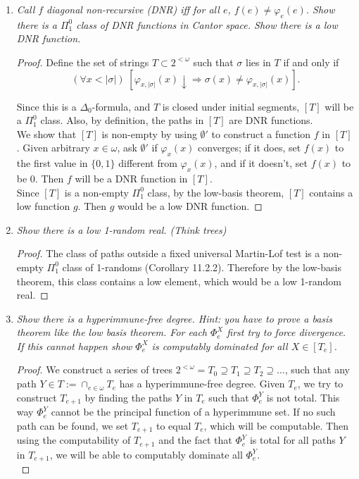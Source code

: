 \documentclass{article}
\begin{document}
\begin{enumerate}
  \item \it Call $f$ diagonal non-recursive (DNR) iff for all $e$,
    $f(e)\neq\varphi_e(e)$. Show there is a $\Pi_1^0$ class of DNR
    functions in Cantor space. Show there is a low DNR function.

    \begin{proof}
      Define the set of strings $T\subset2^{<\omega}$ such that $\sigma$
      lies in $T$ if and only if
      \[(\forall x<|\sigma|)\; [\varphi_{x,|\sigma|}(x)\downarrow
      \Rightarrow \sigma(x) \neq\varphi_{x,|\sigma|}(x)].\]

      Since this is a $\Delta_0$-formula, and $T$ is closed under initial
      segments, $[T]$ will be a $\Pi_1^0$ class. Also, by definition, the
      paths in $[T]$ are DNR functions. \\

      We show that $[T]$ is non-empty by using $\emptyset'$ to construct a
      function $f$ in $[T]$. Given arbitrary $x\in\omega$, ask $\emptyset'$
      if $\varphi_x(x)$ converges; if it does, set $f(x)$ to the first
      value in $\{0,1\}$ different from $\varphi_x(x)$, and if it
      doesn't, set $f(x)$ to be 0. Then $f$ will be a DNR function in
      $[T]$. \\

      Since $[T]$ is a non-empty $\Pi_1^0$ class, by the low-basis theorem,
      $[T]$ contains a low function $g$. Then $g$ would be a low DNR
      function.
    \end{proof}

  \item \it Show there is a low 1-random real. (Think trees)
    \begin{proof}
      The class of paths outside a fixed universal Martin-Lof test is a
      non-empty $\Pi_1^0$ class of 1-randoms (Corollary 11.2.2). Therefore
      by the low-basis theorem, this class contains a low element, which
      would be a low 1-random real.
    \end{proof}

  \item \it Show there is a hyperimmune-free degree. Hint: you have to
    prove a basis theorem like the low basis theorem. For each $\Phi^X_e$
    first try to force divergence. If this cannot happen show $\Phi_e^X$ is
    computably dominated for all $X\in[T_e]$.

    \begin{proof}
      We construct a series of trees $2^{<\omega}=T_0\supseteq T_1\supseteq
      T_2\supseteq\ldots$, such that any path $Y\in
      T:=\cap_{e\in\omega}T_e$ has a hyperimmune-free degree. Given $T_e$,
      we try to construct $T_{e+1}$ by finding the paths $Y$ in $T_e$ such
      that $\Phi^Y_e$ is not total. This way $\Phi^Y_e$ cannot be the
      principal function of a hyperimmune set. If no such path can be
      found, we set $T_{e+1}$ to equal $T_e$, which will be computable.
      Then using the computability of $T_{e+1}$ and the fact that
      $\Phi^Y_e$ is total for all paths $Y$ in $T_{e+1}$, we will be able
      to computably dominate all $\Phi^Y_e$. \\


\end{proof}
\end{enumerate}
\end{document}
